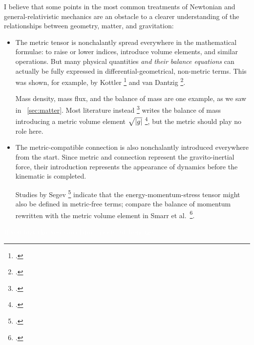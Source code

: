 \documentclass[\ifafour a4paper,12pt,\else a5paper,10pt,\fi%
onecolumn,oneside,article,%
british%
]{memoir}
\theoremstyle{remark}
\theoremstyle{innote}
\newcommand*{\citep}{\footcites}
\newcommand*{\citey}{\footcites}%
\newcommand*{\di}{\mathrm{d}}%
\DeclarePairedDelimiter\abs{\lvert}{\rvert}
\renewcommand*{\|}[1][]{\nonscript\,#1\vert\nonscript\;\mathopen{}}
\newcommand*{\sect}{\S}%
\newcommand*{\eg}{{e.g.}}
\newcommand*{\cf}{{cf.}}
\newcommand*{\etal}{{et al.}}
\newcommand*{\puzzle}{{\fontencoding{U}\fontfamily{fontawesometwo}\selectfont\symbol{225}}}
\newcommand*{\psect}{{\footnotesize\puzzle}}%
\newcommand*{\Li}{\mathrm{L}}
\newcommand*{\yvv}{n}
\newcommand*{\yv}{\bm{\yvv}}
\begin{document}
I believe that some points in the most common treatments of Newtonian and
general-relativistic mechanics are an obstacle to a clearer understanding
of the relationships between geometry, matter, and gravitation:
\begin{itemize}[para]
\item The metric tensor is nonchalantly spread everywhere in the
  mathematical formulae: to raise or lower indices, introduce volume
  elements, and similar operations. But many physical quantities \emph{and
    their balance equations} can actually be fully expressed in
  differential-geometrical, non-metric terms. This was shown, for example,
  by Kottler \citey{kottler1922,kottler1922b} and van Dantzig
  \citey{vandantzig1934,vandantzig1934b,vandantzig1934c,vandantzig1934d,vandantzig1934e,vandantzig1937,schoutenetal1940,vandantzig1954}.

  Mass density, mass flux, and the balance of mass are one example, as we
  saw in \psect~\ref{sec:matter}. Most literature instead
  \citep[\eg,][p.~171]{smarretal1980} writes the balance of mass introducing
  a metric volume element $\sqrt{\abs{g}}$ \citep[\cf][\sect~V.B.4,
  pp.~317--318]{choquetbruhatetal1977_r1996}, but the metric should play no
  role here.

\item The metric-compatible connection is also nonchalantly introduced
  everywhere from the start. Since metric and connection represent the
  gravito-inertial force, their introduction represents the appearance of
  dynamics before the kinematic is completed.

  Studies by Segev \citey{segev2002} indicate that the
  energy-momentum-stress tensor might also be defined in metric-free terms;
  compare the balance of momentum rewritten with the metric volume element
  in Smarr \etal\ \citey[p.~171]{smarretal1980}.
\end{itemize}

\textcolor{white}{If you find this you can claim a postcard from me.}

\end{document}
